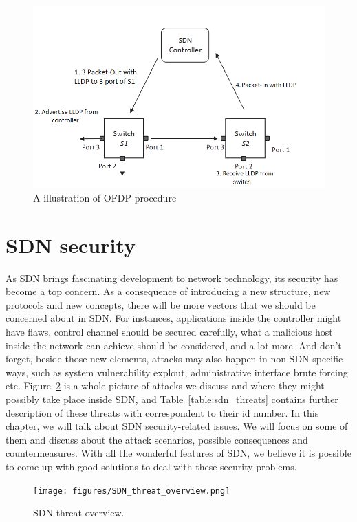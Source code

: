 \begin{figure}[H]
\begin{center} 
\includegraphics[width=1\textwidth]{figures/OFDP_procedure.png}
\end{center}
\caption{A illustration of OFDP procedure}
\label{OFDP}
\end{figure}

\section{SDN security}
As SDN brings fascinating development to network technology, its security has become a top concern. As a consequence of introducing a new structure, new protocols and new concepts, there will be more vectors that we should be concerned about in SDN. For instances, applications inside the controller might have flaws, control channel should be secured carefully, what a malicious host inside the network can achieve should be considered, and a lot more. And don't forget, beside those new elements, attacks may also happen in non-SDN-specific ways, such as system vulnerability explout, administrative interface brute forcing etc. Figure~\ref{SND_threat_overview} is a whole picture of attacks we discuss and where they might possibly take place inside SDN, and Table~\ref{table:sdn_threats} contains further description of these threats with correspondent to their id number. In this chapter, we will talk about SDN security-related issues. We will focus on some of them and discuss about the attack scenarios, possible consequences and countermeasures. With all the wonderful features of SDN, we believe it is possible to come up with good solutions to deal with these security problems.

\begin{figure}[H]
\begin{center} 
\texttt{[image: figures/SDN\_threat\_overview.png]}
\end{center}
\caption{SDN threat overview.}
\label{SND_threat_overview}
\end{figure}

